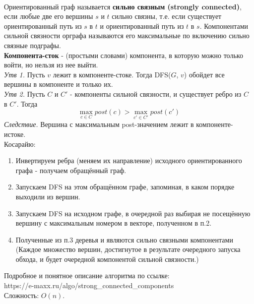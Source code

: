 \\
Ориентированный граф называется {\bf сильно связным (strongly connected)}, если любые две его вершины $s$ и $t$ сильно связны, т.е. если существует ориентированный путь из $s$ в $t$ и ориентированный путь из $t$ в $s$. Компонентами сильной связности орграфа называются его максимальные по включению сильно связные подграфы.\\
{\bf Компонента-сток} - (простыми словами) компонента, в которую можно только войти, но нельзя из нее выйти.\\
{\it Утв 1.} Пусть $v$ лежит в компоненте-стоке. Тогда DFS($G$, $v$) обойдет все вершины в компоненте и только их.\\
{\it Утв 2.} Пусть $C$ и $C'$ - компоненты сильной связности, и существует ребро из $C$ в $C'$. Тогда
$$
\max\limits_{c\in C} post(c) > \max\limits_{c'\in C'} post(c')
$$
{\it Следствие.} Вершина с максимальным post-значением лежит в компоненте-истоке.\\

 Косарайю:
\begin{enumerate}
\item Инвертируем ребра (меняем их направление) исходного ориентированного графа - получаем обращённый граф.
\item Запускаем DFS на этом обращённом графе, запоминая, в каком порядке выходили из вершин.
\item Запускаем DFS на исходном графе, в очередной раз выбирая не посещённую вершину с максимальным номером в векторе, полученном в п.2.
\item Полученные из п.3 деревья и являются сильно связными компонентами (Каждое множество вершин, достигнутое в результате очередного запуска обхода, и будет очередной компонентой сильной связности.)
\end{enumerate}
Подробное и понятное описание алгоритма по ссылке:\\
https://e-maxx.ru/algo/strong\_connected\_components\\
Сложность: $O(n)$. 
